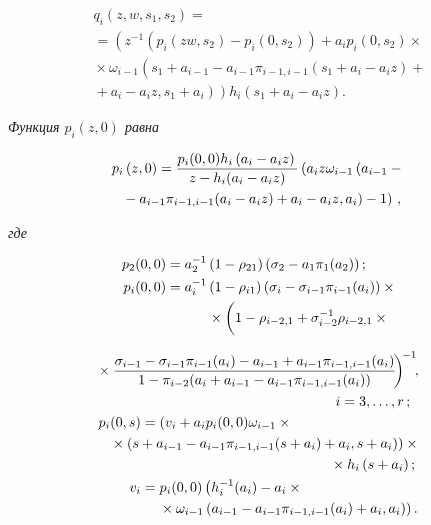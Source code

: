 \begin{multicols}{2}
\noindent
\begin{multline}
\label{n5}
q_i\left(z,w,s_1,s_2\right)={}\\
{}=
\left(z^{-1}\left(p_i(zw,s_2)-p_i(0,s_2)\right)+a_ip_i\left(0,s_2\right)\right.\times{}\\
{}\times\omega_{i-1}\left(s_1+a_{i-1}-a_{i-1}\pi_{i-1,i-1}
\left(s_1+a_i-a_iz\right)+{}\right.\\
\left.\left.{}+a_i-a_iz,s_1+a_i\right)\right)
h_i(s_1+a_i-a_iz).
\end{multline}

\vspace*{-2pt}

\noindent
\textit{Функция $p_i\left(z,0\right)$ равна}

\vspace*{-6pt}

\noindent
\begin{multline}
\label{n6}
p_i\left(z,0\right)=\displaystyle\frac{\displaystyle p_i(0,0)h_i\left(a_i-a_iz\right)\mathstrut}{\displaystyle z-h_i(a_i-a_iz)\mathstrut}
 \left(a_iz\omega_{i-1}
\left(a_{i-1}-{}\right.\right.\\
\left.\left.{}-a_{i-1}\pi_{i-1,i-1}(a_i-a_iz)+a_i-a_iz,a_i\right)-1\right)\,,
\end{multline}

\vspace*{-2pt} 

\noindent
\textit{где}

\noindent
\begin{align*}
p_2(0,0)&=a_2^{-1}\left(1-\rho_{21}\right)\left(\sigma_2-a_1\pi_1(a_2)\right);
\\
p_i(0,0)&=a_i^{-1}\left(1-\rho_{i1}\right)\left(\sigma_i-\sigma_{i-1}\pi_{i-1}(a_i)\right)\times{}\\
&\hspace*{30pt}{}\times
\left( 
\vphantom{\fr{\sigma_{i-1}-\sigma_{i-1}\pi_{i-1}(a_i)-a_{i-1}+a_{i-1}\pi_{i-1,i-1}(a_i)}
{1-\pi_{i-2}(a_i+a_{i-1}-a_{i-1}\pi_{i-1,i-1}(a_i))}}
1-\rho_{i-2,1}+\sigma_{i-2}^{-1}\rho_{i-2,1}\times{}\right.
\end{align*}

\noindent
\begin{align*}
&\hspace*{-35pt}\left.{}\times
\fr{\sigma_{i-1}-\sigma_{i-1}\pi_{i-1}(a_i)-a_{i-1}+a_{i-1}\pi_{i-1,i-1}(a_i)}
{1-\pi_{i-2}(a_i+a_{i-1}-a_{i-1}\pi_{i-1,i-1}(a_i))}\!\right)^{\!-1}\!\!,\\
 &\hspace*{139pt}i=3,\ldots,r\,;
\\
p_i(0,s)&=\left(v_i+a_ip_i(0,0)\omega_{i-1}\times{}\right.\\
&\hspace*{-25pt}\left.{}\times 
\left(s+a_{i-1}-a_{i-1}\pi_{i-1,i-1}(s+a_i)+a_i,s+a_i\right)\right)\times{}\\
&\hspace*{135pt}{}\times h_i\left(s+a_i\right);
\\
v_i&=p_i(0,0)\left(h_i^{-1}(a_i)-a_i\times{}\right.\\
&\hspace*{10pt}\left.{}\times\omega_{i-1} \left(a_{i-1}-a_{i-1}\pi_{i-1,i-1}(a_i)+a_i,a_i\right)\right).
\end{align*}



\end{multicols}
